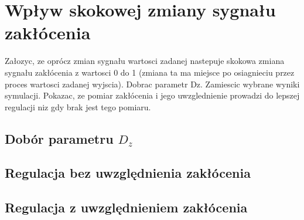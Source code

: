 \section{Wpływ skokowej zmiany sygnału zakłócenia}

Załozyc, ze oprócz zmian sygnału wartosci zadanej nastepuje skokowa zmiana sygnału
zakłócenia z wartosci 0 do 1 (zmiana ta ma miejsce po osiagnieciu przez proces wartosci
zadanej wyjscia). Dobrac parametr Dz. Zamiescic wybrane wyniki symulacji. Pokazac,
ze pomiar zakłócenia i jego uwzglednienie prowadzi do lepszej regulacji niz gdy brak
jest tego pomiaru.


\subsection{Dobór parametru $D_z$}

\subsection{Regulacja bez uwzględnienia zakłócenia}

\subsection{Regulacja z uwzględnieniem zakłócenia}
